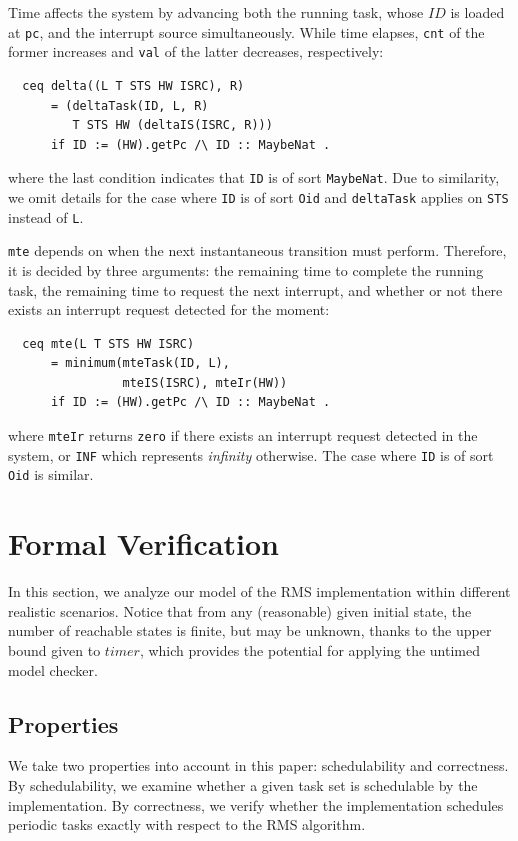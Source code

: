 \documentclass[12pt,onecolumn]{IEEEtranTIE}
\begin{document}
Time affects the system by advancing both the running task, whose
$\mathit{ID}$ is loaded at \verb|pc|, and the interrupt source
simultaneously.  While time elapses, \verb|cnt| of the former
increases and \verb|val| of the latter decreases, respectively:
\begin{verbatim}
  ceq delta((L T STS HW ISRC), R)
      = (deltaTask(ID, L, R) 
         T STS HW (deltaIS(ISRC, R)))
      if ID := (HW).getPc /\ ID :: MaybeNat .
\end{verbatim}
where the last condition indicates that \verb|ID| is of sort
\verb|MaybeNat|. Due to similarity, we omit details for the case where
\verb|ID| is of sort \verb|Oid| and \verb|deltaTask| applies on
\verb|STS| instead of \verb|L|.

\verb|mte| depends on when the next instantaneous transition must
perform. Therefore, it is decided by three arguments: the remaining
time to complete the running task, the remaining time to request the
next interrupt, and whether or not there exists an interrupt request
detected for the moment:
\begin{verbatim}
  ceq mte(L T STS HW ISRC)
      = minimum(mteTask(ID, L),
                mteIS(ISRC), mteIr(HW))
      if ID := (HW).getPc /\ ID :: MaybeNat .
\end{verbatim}
where \verb|mteIr| returns \verb|zero| if there exists an interrupt
request detected in the system, or \verb|INF| which represents
\emph{infinity} otherwise. The case where \verb|ID| is of sort
\verb|Oid| is similar.


\section{Formal Verification}
\label{s:verification}
In this section, we analyze our model of the RMS implementation within
different realistic scenarios.  Notice that from any (reasonable)
given initial state, the number of reachable states is finite, but may
be unknown, thanks to the upper bound given to $\mathit{timer}$, which
provides the potential for applying the untimed model checker.

\subsection{Properties}
We take two properties into account in this paper: schedulability and
correctness. By schedulability, we examine whether a given task set is
schedulable by the implementation. By correctness, we verify whether
the implementation schedules periodic tasks exactly with respect to
the RMS algorithm.
\end{document}
